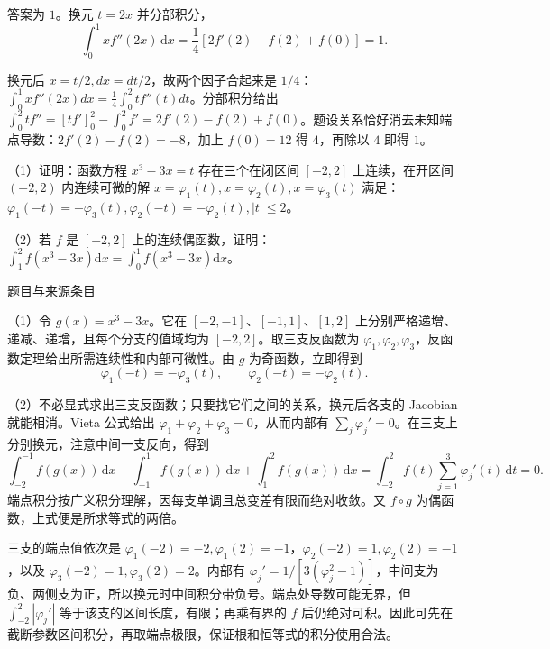 \documentclass[UTF8,12pt,a4paper,fontset=fandol]{ctexart}
\begin{document}
\begin{solve}\label{ans:fin11-high:2}

答案为 $1$。换元 $t=2x$ 并分部积分，
\[
\int_0^1xf''(2x)\,\mathrm dx=\frac14[2f'(2)-f(2)+f(0)]=1.
\]

换元后 $x=t/2,dx=dt/2$，故两个因子合起来是 $1/4$：$\int_0^1xf''(2x)dx=\tfrac14\int_0^2tf''(t)dt$。分部积分给出 $\int_0^2tf''=[tf']_0^2-\int_0^2f'=2f'(2)-f(2)+f(0)$。题设关系恰好消去未知端点导数：$2f'(2)-f(2)=-8$，加上 $f(0)=12$ 得 $4$，再除以 $4$ 即得 $1$。

\end{solve}

\begin{example}[来源序号7]\label{ex:fin11-high:7}\label{pr:fin11-high:7}

（1）证明：函数方程 $x^{3} - 3x = t$ 存在三个在闭区间 $[-2,2]$ 上连续，在开区间 $(-2,2)$ 内连续可微的解 $x = \varphi_{1}(t), x = \varphi_{2}(t), x = \varphi_{3}(t)$ 满足：
$\varphi_{1}(-t) = -\varphi_{3}(t), \varphi_{2}(-t) = -\varphi_{2}(t), |t| \leq 2$。

（2）若 $f$ 是 $[-2,2]$ 上的连续偶函数，证明：
$\int_{1}^{2} f\left(x^{3} - 3x\right) \mathrm{d} x = \int_{0}^{1} f\left(x^{3} - 3x\right) \mathrm{d} x$。

\par\href{https://github.com/lzxcr/cmc-mathematics/blob/64916fa1fdbc3e444a652eca204d5669058ee321/src/problems/finals/11/07.md}{题目与来源条目}

\end{example}

\begin{solve}\label{ans:fin11-high:7}

（1）令 $g(x)=x^3-3x$。它在 $[-2,-1]$、$[-1,1]$、$[1,2]$ 上分别严格递增、递减、递增，且每个分支的值域均为 $[-2,2]$。取三支反函数为 $\varphi_1,\varphi_2,\varphi_3$，反函数定理给出所需连续性和内部可微性。由 $g$ 为奇函数，立即得到
\[
\varphi_1(-t)=-\varphi_3(t),\qquad\varphi_2(-t)=-\varphi_2(t).
\]

（2）不必显式求出三支反函数；只要找它们之间的关系，换元后各支的 Jacobian 就能相消。Vieta 公式给出 $\varphi_1+\varphi_2+\varphi_3=0$，从而内部有 $\sum_j\varphi_j'=0$。在三支上分别换元，注意中间一支反向，得到
\[
\int_{-2}^{-1}f(g(x))\,\mathrm dx-\int_{-1}^{1}f(g(x))\,\mathrm dx+\int_1^2f(g(x))\,\mathrm dx
=\int_{-2}^2f(t)\sum_{j=1}^3\varphi_j'(t)\,\mathrm dt=0.
\]
端点积分按广义积分理解，因每支单调且总变差有限而绝对收敛。又 $f\circ g$ 为偶函数，上式便是所求等式的两倍。

三支的端点值依次是 $\varphi_1(-2)=-2,\varphi_1(2)=-1$，$\varphi_2(-2)=1,\varphi_2(2)=-1$，以及 $\varphi_3(-2)=1,\varphi_3(2)=2$。内部有 $\varphi_j'=1/[3(\varphi_j^2-1)]$，中间支为负、两侧支为正，所以换元时中间积分带负号。端点处导数可能无界，但 $\int_{-2}^2|\varphi_j'|$ 等于该支的区间长度，有限；再乘有界的 $f$ 后仍绝对可积。因此可先在截断参数区间积分，再取端点极限，保证根和恒等式的积分使用合法。

\end{solve}
\end{document}

